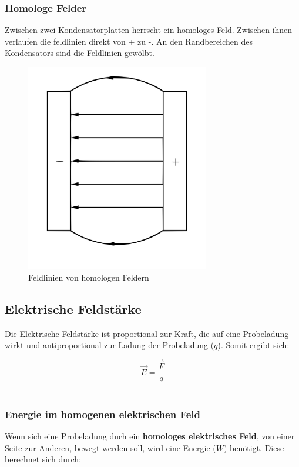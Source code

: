 \documentclass[a4paper]{article}
\begin{document}
\subsubsection{Homologe Felder}
Zwischen zwei Kondensatorplatten herrscht ein homologes Feld. Zwischen ihnen verlaufen die feldlinien
direkt von + zu -. An den Randbereichen des Kondensators sind die Feldlinien gewölbt.

\begin{figure} [h]
	\begin{center}
		\includegraphics[width=8cm]{Bilder/homFeld.png}
		\caption{Feldlinien von homologen Feldern}
	\end{center}
\end{figure}



\subsection{Elektrische Feldstärke}
Die Elektrische Feldstärke ist proportional zur Kraft, die auf eine Probeladung wirkt und antiproportional
zur Ladung der Probeladung ($q$). Somit ergibt sich:

\Large$$\vec{E} = \dfrac{\vec{F}}{q}$$\normalsize\\




\subsubsection{Energie im homogenen elektrischen Feld}
Wenn sich eine Probeladung duch ein \textbf{homologes elektrisches Feld}, von einer Seite zur Anderen,
bewegt werden soll, wird eine Energie ($W$) benötigt. Diese berechnet sich durch:
\end{document}
